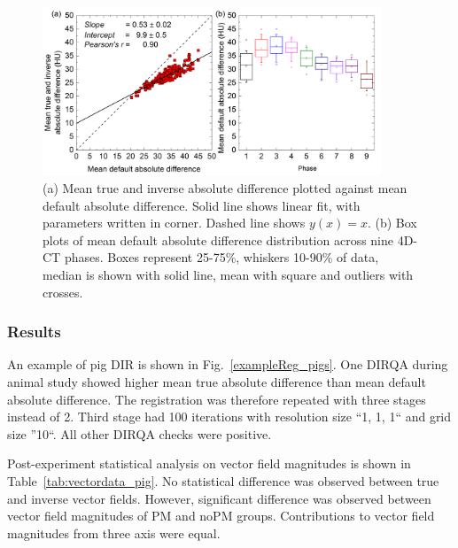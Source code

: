 \begin{figure}[H]
	\begin{center}		
		\includegraphics[width=0.9\textwidth]{./VisualMotionManagment/Images/AbsDiff_pigs.png}
		\caption{(a) Mean true and inverse absolute difference plotted against mean default absolute difference. Solid line shows linear fit, with parameters
		written in corner. Dashed line shows $y(x)=x$. (b) Box plots of mean default absolute difference distribution across nine 4D-CT phases. Boxes represent 25-75\%, whiskers 10-90\%
		of data, median is shown with solid line, mean with square and outliers with crosses.}
		\label{absDiff_pigs}
	\end{center}
\end{figure}

\subsubsection{Results}

An example of pig DIR is shown in Fig.~\ref{exampleReg_pigs}. One DIRQA during animal study showed higher mean true absolute difference than mean default absolute difference. The registration
was therefore repeated with three stages instead of 2. Third stage had 100 iterations with resolution size ``1, 1, 1`` and grid size ''10``. All other DIRQA checks were positive.

Post-experiment statistical analysis on vector field magnitudes is shown in Table~\ref{tab:vectordata_pig}. No statistical difference was
observed between true and inverse vector fields. However, significant difference was observed between vector field magnitudes of PM and noPM groups. Contributions to vector field magnitudes from three axis were equal. 


